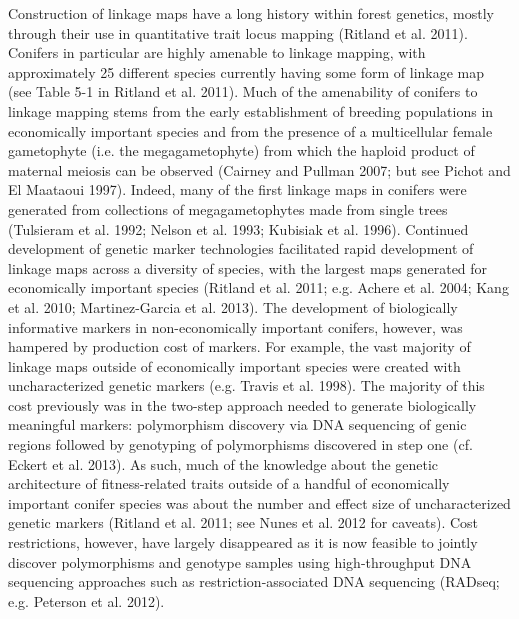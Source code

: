\documentclass[11pt]{article}
\begin{document}
Construction of linkage maps have a long history within forest genetics, mostly through their use in quantitative trait locus mapping (Ritland et al. 2011). 
Conifers in particular are highly amenable to linkage mapping, with approximately 25 different species currently having some 
form of linkage map (see Table 5-1 in Ritland et al. 2011). Much of the amenability of conifers to linkage mapping stems from 
the early establishment of breeding populations in economically important species and from the presence of a multicellular 
female gametophyte (i.e. the megagametophyte) from which the haploid product of maternal meiosis can be observed (Cairney and Pullman 2007; 
but see Pichot and El Maataoui 1997). Indeed, many of the first linkage maps in conifers were generated from collections of 
megagametophytes made from single trees (Tulsieram et al. 1992; Nelson et al. 1993; Kubisiak et al. 1996). Continued development 
of genetic marker technologies facilitated rapid development of linkage maps across a diversity of species, with the largest maps 
generated for economically important species (Ritland et al. 2011; e.g. Achere et al. 2004; Kang et al. 2010; Martinez-Garcia et al. 2013). 
The development of biologically informative markers in non-economically important conifers, however, was hampered by production cost of markers. 
For example, the vast majority of linkage maps outside of economically important species were created with uncharacterized genetic 
markers (e.g. Travis et al. 1998). The majority of this cost previously was in the two-step approach needed to generate biologically 
meaningful markers: polymorphism discovery via DNA sequencing of genic regions followed by genotyping of polymorphisms 
discovered in step one (cf. Eckert et al. 2013). As such, much of the knowledge about the genetic architecture of fitness-related 
traits outside of a handful of economically important conifer species was about the number and effect size of uncharacterized 
genetic markers (Ritland et al. 2011; see Nunes et al. 2012 for caveats). Cost restrictions, however, have largely disappeared 
as it is now feasible to jointly discover polymorphisms and genotype samples using high-throughput DNA sequencing approaches such as restriction-associated 
DNA sequencing (RADseq; e.g. Peterson et al. 2012). 
\end{document}
